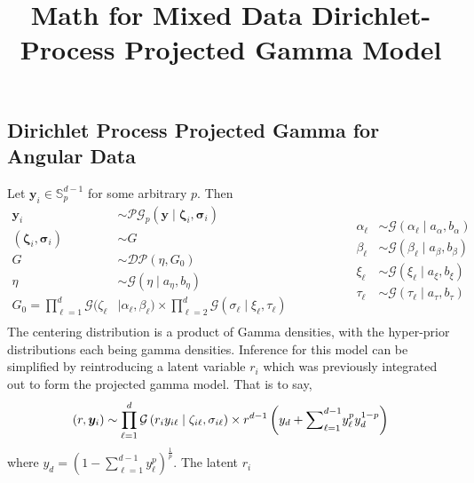 \documentclass[10pt]{article}
\title{Math for Mixed Data Dirichlet-Process Projected Gamma Model}
\begin{document}
\maketitle

\subsection*{Dirichlet Process Projected Gamma for Angular Data}
Let $\bm{y}_i\in {\mathbb S}_{p}^{d-1}$ for some arbitrary $p$.  Then
\begin{equation*}
    \begin{aligned}
    \bm{y}_i &\sim \mathcal{PG}_p\left(\bm{y}\mid\bm{\zeta}_i,\bm{\sigma}_i\right)\\
    (\bm{\zeta}_i,\bm{\sigma}_i) &\sim G \\
    G &\sim \mathcal{DP}\left(\eta, G_0\right)\\
    \eta &\sim \mathcal{G}\left(\eta\mid a_{\eta}, b_{\eta}\right)\\
    G_0 = \prod_{\ell = 1}^d\mathcal{G}(\zeta_{\ell}&\mid\alpha_{\ell},\beta_{\ell})
        \times\prod_{\ell = 2}^d\mathcal{G}(\sigma_{\ell}\mid\xi_{\ell},\tau_{\ell})\\
    \end{aligned}
    \hspace{2cm}
    \begin{aligned}
    \alpha_{\ell} &\sim \mathcal{G}(\alpha_{\ell} \mid a_{\alpha},b_{\alpha})\\
    \beta_{\ell} &\sim \mathcal{G}(\beta_{\ell}\mid a_{\beta}, b_{\beta})\\
    \xi_{\ell} &\sim \mathcal{G}(\xi_{\ell} \mid a_{\xi}, b_{\xi})\\
    \tau_{\ell} &\sim \mathcal{G}(\tau_{\ell}\mid a_{\tau},b_{\tau})\\
    \end{aligned}
\end{equation*}
The centering distribution is a product of Gamma densities, with the hyper-prior distributions 
    each being gamma densities. Inference for this model can be simplified by reintroducing a 
    latent variable $r_i$ which was previously integrated out to form the projected gamma model.  
    That is to say,
\[
    (r,\bm{y}_i) \sim \prod_{\ell = 1}^d 
        \mathcal{G}\left(r_iy_{i\ell}\mid\zeta_{i\ell},\sigma_{i\ell}\right) \times
        r^{d-1}\left(y_d + {\small\sum}_{\ell = 1}^{d-1}y_{\ell}^py_d^{1-p}\right)
\]
where $y_d = \left(1 - \sum_{\ell = 1}^{d-1}y_{\ell}^p\right)^{\frac{1}{p}}$. The latent $r_i$ 
\end{document}
